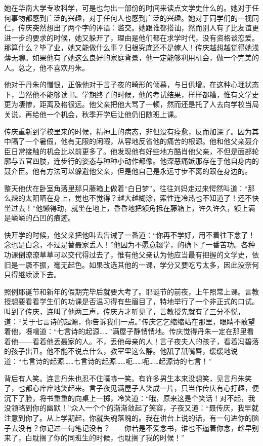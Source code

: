 \par 她在华南大学专攻科学，可是也匀出一部份的时间来读点文学史什么的。她对于任何事物都感到广泛的兴趣，对于任何人也感到广泛的兴趣。她对于同学们的一视同仁，传庆突然想出了两个字的评语：滥交。她跟谁都搭讪，然而别人有了比友谊更进一步的要求的时候，她又躲开了，理由是他们都在求学时代，没有资格谈恋爱。那算什么？毕了业，她又能做什么事？归根究底还不是嫁人！传庆越想越觉得她浅薄无聊。如果他有了她这么良好的家庭背景，他一定能够利用机会，做一个完美的人。总之，他不喜欢丹朱。
\par 他对于丹朱的憎恨，正像他对于言子夜的畸形的倾慕，与日俱增。在这种心理状态下，当然他不能够读书。学期终了的时候，他的考试结果，样样都糟，惟有文学史更为凄惨，距离及格很远。他父亲把他大骂了一顿，然而还是托了人去向学校当局关说，再给他一个机会，秋季开学后让他仍旧随班上课。
\par 传庆重新到学校里来的时候，精神上的病态，非但没有痊愈，反而加深了。因为其中隔了一个暑假，他有无限的闲暇，从容地反省他的痛苦的根源。他和他父亲聂介臣日常接触的机会比以前更多了。他发现他有好些地方酷肖他父亲，不但是面部轮廓与五官四肢，连步行的姿态与种种小动作都像。他深恶痛嫉那存在于他自身内的聂介臣。他有方法可以躲避他父亲，但是他自己是永远寸步不离的跟在身边的。
\par 整天他伏在卧室角落里那只藤箱上做着“白日梦”。往往刘妈走过来愕然叫道：“那么辣的太阳晒在身上，觉也不觉得？越大越糊涂，索性连冷热也不知道了！还不快坐过去！”他懒得动，就坐在地上，昏昏地把额角抵在藤箱上，许久许久，额上满是嶙嶙的凸凹的痕迹。
\par 快开学的时候，他父亲把他叫去告诫了一番道：“你再不学好，用不着往下念了！念也是白念，不过是替聂家丢人！”他因为不愿意辍学，的确下了一番苦功。各种功课倒潦潦草草可以交代得过去了，惟有他父亲认为他应当最有把握的文学史，依旧是一蹶不振，毫无起色。如果改选其他的一课，学分又要吃亏太多，因此没奈何只得继续读下去。
\par 照例耶诞节和新年的假期完毕后就要大考了。耶诞节的前夜，上午照常上课。言教授想要看看学生们的功课是否温习得有些眉目了，特地举行了一个非正式的口试。叫到了传庆，连叫了他两三声，传庆方才听见了，言教授先就有了三分不悦，道：“关于七言诗的起源，你告诉我们一点。”传庆乞乞缩缩站在那里，眼睛不敢望着他，嗫嚅道：“七言诗的起源……”满屋子静悄悄地。传庆觉得丹朱一定在那里看着他——看着他丢聂家的人。不，丢他母亲的人！言子夜夫人的孩子，看着冯碧落的孩子出丑。他不能不说点什么，教室里这么静。他舐了舐嘴唇，缓缓地说道：“七言诗的起源……七言诗的起源……呃……呃……起源诗的七言！”
\par 背后有人笑。连言丹朱也忍不住噗哧一笑。有许多男生本来没想笑，见言丹朱笑了，也都心痒痒地笑起来。言子夜见满屋子人笑成一片，只当作传庆有心打趣，便沉下了脸，将书重重的向桌上一掷，冷笑道：“哦，原来这是个笑话！对不起，我没领略到你的幽默！”众人一个个的渐渐敛起了笑容，子夜又道：“聂传庆，我早就注意到你了。从上学期起，你就失魂落魄的。我在讲台上说的话，有一句进你的脑子去没有？你记过一句笔记没有？——你若是不爱念书，谁也不逼着你念，趁早别来了，白耽搁了你的同班生的时候，也耽搁了我的时候！”
